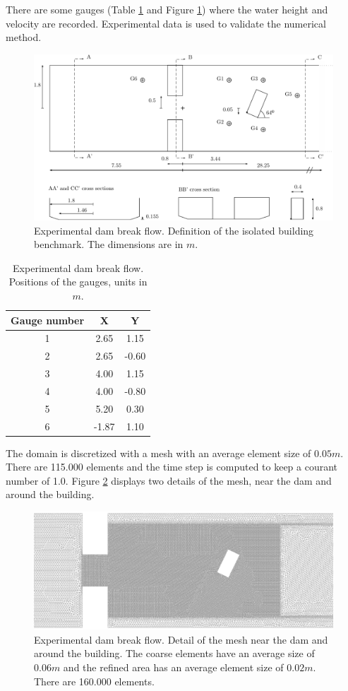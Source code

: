\documentclass[a4paper,12pt]{elsarticle}
\begin{document}
There are some gauges (Table \ref{gauges_positions} and Figure \ref{experiment_sketch}) where the water height and velocity are recorded. Experimental data is used to validate the numerical method.

\begin{figure}[H]
\centering
\includegraphics[width=\textwidth]{img/exp/sketch.pdf}
\caption{Experimental dam break flow. Definition of the isolated building benchmark. The dimensions are in $m$.}
\label{experiment_sketch}
\end{figure}

\begin{table}
\centering
\begin{tabular}{ccc}
\hline
Gauge number & X & Y \\ \hline
1 &  2.65 &  1.15 \\
2 &  2.65 & -0.60 \\
3 &  4.00 &  1.15 \\
4 &  4.00 & -0.80 \\
5 &  5.20 &  0.30 \\
6 & -1.87 &  1.10 \\ \hline
\end{tabular}
\caption{Experimental dam break flow. Positions of the gauges, units in $m$.}
\label{gauges_positions}
\end{table}

The domain is discretized with a mesh with an average element size of $0.05m$. There are 115.000 elements and the time step is computed to keep a courant number of 1.0. Figure \ref{experiment_mesh} displays two details of the mesh, near the dam and around the building.

\begin{figure}[H]
\centering
\includegraphics[width=.8\textwidth]{img/exp/experiment_mesh.png}
\caption{Experimental dam break flow. Detail of the mesh near the dam and around the building. The coarse elements have an average size of $0.06m$ and the refined area has an average element size of $0.02m$. There are 160.000 elements.}
\label{experiment_mesh}
\end{figure}
\end{document}
